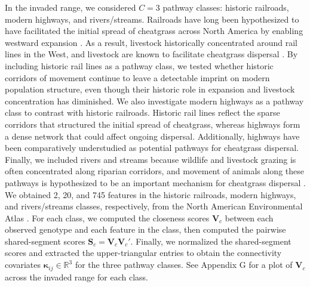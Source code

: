 \documentclass{article}
\begin{document}
In the invaded range, we considered $C=3$ pathway classes: historic railroads, modern highways, and rivers/streams. Railroads have long been hypothesized to have facilitated the initial spread of cheatgrass across North America by enabling westward expansion \citep{mack1981invasion}. As a result, livestock historically concentrated around rail lines in the West, and livestock are known to facilitate cheatgrass dispersal \citep{williamson2020fire}. By including historic rail lines as a pathway class, we tested whether historic corridors of movement continue to leave a detectable imprint on modern population structure, even though their historic role in expansion and livestock concentration has diminished.
We also investigate modern highways as a pathway class to contrast with historic railroads. Historic rail lines reflect the sparse corridors that structured the initial spread of cheatgrass, whereas highways form a dense network that could affect ongoing dispersal. Additionally, highways have been comparatively understudied as potential pathways for cheatgrass dispersal. 
Finally, we included rivers and streams because wildlife and livestock grazing is often concentrated along riparian corridors, and movement of animals along these pathways is hypothesized to be an important mechanism for cheatgrass dispersal \citep{king2019potential,molvar2024cheatgrass}. We obtained 2, 20, and 745 features in the historic railroads, modern highways, and rivers/streams classes, respectively, from the North American Environmental Atlas \citep{cec-data}. For each class, we computed the closeness scores $\mathbf{V}_c$ between each observed genotype and each feature in the class, then computed the pairwise shared-segment scores $\mathbf{S}_c=\mathbf{V}_c\mathbf{V}_c'$. Finally, we normalized the shared-segment scores and extracted the upper-triangular entries to obtain the connectivity covariates  $\boldsymbol\kappa_{ij}\in\mathbb{R}^3$ for the three pathway classes. See Appendix G for a plot of $\mathbf{V}_c$ across the invaded range for each class.
\end{document}
